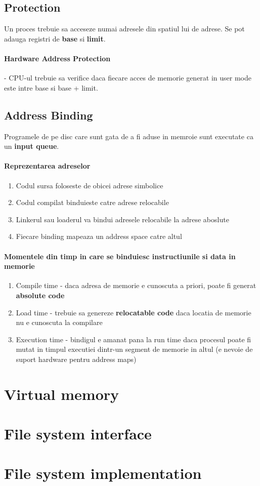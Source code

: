 \documentclass{article}
\begin{document}
\subsection*{Protection}
Un proces trebuie sa acceseze numai adresele din spatiul lui de adrese. Se pot adauga registri de \textbf{base} si \textbf{limit}.
\paragraph*{Hardware Address Protection} - CPU-ul trebuie sa verifice daca fiecare acces de memorie generat in user mode este intre base si base + limit.
\subsection*{Address Binding}
Programele de pe disc care sunt gata de a fi aduse in memroie sunt executate ca un \textbf{input queue}.
\paragraph*{Reprezentarea adreselor}
\begin{enumerate}
    \item Codul sursa foloseste de obicei adrese simbolice
    \item Codul compilat binduieste catre adrese relocabile
    \item Linkerul sau loaderul va bindui adresele relocabile la adrese aboslute
    \item Fiecare binding mapeaza un address space catre altul
\end{enumerate}
\paragraph*{Momentele din timp in care se binduiesc instructiunile si data in memorie}
\begin{enumerate}
    \item Compile time - daca adresa de memorie e cunoscuta a priori, poate fi generat \textbf{absolute code}
    \item Load time - trebuie sa genereze \textbf{relocatable code} daca locatia de memorie nu e cunoscuta la compilare
    \item Execution time - bindigul e amanat pana la run time daca procesul poate fi mutat in timpul executiei dintr-un segment de memorie in altul (e nevoie de suport hardware pentru address maps)
\end{enumerate}





\section[Ch10 Virtual memory]{Virtual memory}
\section[Ch13 File system interface]{File system interface}
\section[Ch14 File system implementation]{File system implementation}
\end{document}
